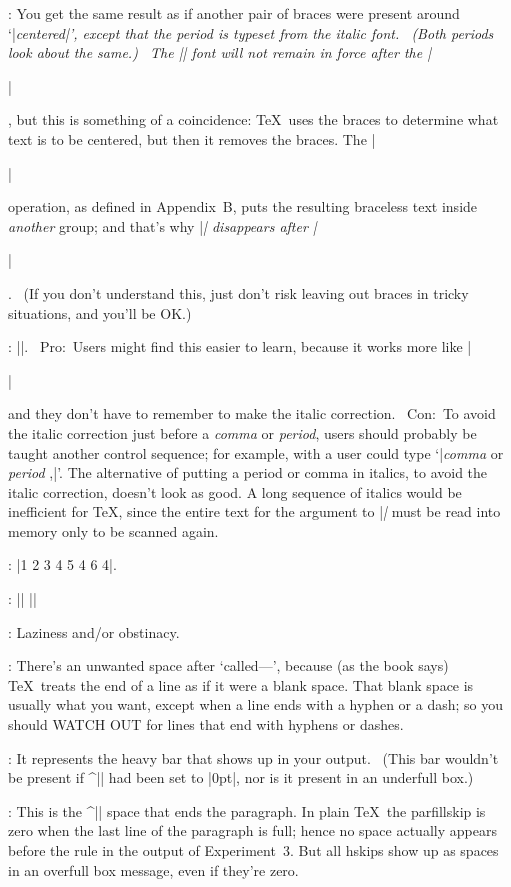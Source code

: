 :
 You get the same result as if another pair of braces were present around
`|\it centered|', except that the period is typeset from the italic font. \
(Both periods look about the same.) \ The |\it| font will not remain in force
after the |\centerline|, but this is something of a coincidence: \TeX\ uses
the braces to determine what text is to be centered, but then it removes
the braces. The |\centerline| operation, as defined in Appendix~B\null, puts the
resulting braceless text inside {\sl another\/} group; and that's why
|\it| disappears after |\centerline|. \ (If you don't understand this, just
don't risk leaving out braces in tricky situations, and you'll be OK.)

:
 |\def\ital#1{{\it#1\/}}|. \ Pro:~Users might find this easier to
learn, because it works more like |\centerline| and they don't have to
remember to make the italic correction. \ Con:~To avoid the italic correction
just before a {\it comma} or {\it period}, users should probably be taught
another control sequence; for example, with
\begintt
\def\nocorr{\kern0pt }
\endtt
a user could type `|\ital{comma} or \ital{period\nocorr},|'. The alternative
of putting a period or comma in italics, to avoid the italic correction,
doesn't look as good. A long sequence of italics would be inefficient for
\TeX, since the entire text for the argument to |\ital| must be read into
memory only to be scanned again.

:
 |{1 {2 3 4 5} 4 6} 4|.

:
 |\def\beginthe#1{\begingroup\def\blockname{#1}}|\parbreak
|\def\endthe#1{\def\test{#1}%
|  \ifx\test\blockname\endgroup|\parbreak
|  \else\errmessage{You should have said|\parbreak
|    \string\endthe{\blockname}}\fi}|

:
 Laziness and/or obstinacy.

:
 There's an unwanted space after `called---', because (as the book
says) \TeX\ treats the end of a line as if it were a blank space. That
blank space is usually what you want, except when a line ends with a
hyphen or a dash; so you should {\sc WATCH OUT} for lines that end with
hyphens or dashes.

:
 It represents the heavy bar that shows up in
your output. \ (This bar wouldn't be present if\/ ^|\overfullrule| had been
set to |0pt|, nor is it present in an underfull box.)

:
 This is the ^|\parfillskip| space that ends the paragraph.
In plain \TeX\ the parfillskip is zero when the last line of the paragraph
is full; hence no space actually appears before the rule in the output
of Experiment~3. But all hskips show up as spaces in an overfull box
message, even if they're zero.

